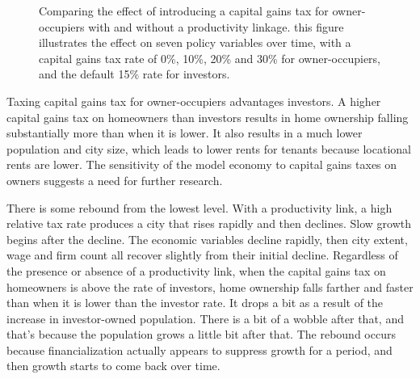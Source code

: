 \begin{figure}[h!tb]
     \caption[Capital gains tax for owner-occupiers with and without a linkage]{Comparing the effect of introducing a capital gains tax for owner-occupiers with and without a productivity linkage. this figure illustrates the effect on seven policy variables over time, with a capital gains tax rate of 0\%, 10\%, 20\% and 30\% for owner-occupiers, and the default 15\% rate for investors.}
    \label{fig:CG-pers_link_W-WO-Cost-of-capital}
\end{figure}
Taxing capital gains tax for owner-occupiers advantages investors. 
A higher capital gains tax on homeowners than investors %
results in home ownership falling substantially more than when it is lower. It also results in a much lower population and city size, which leads to lower rents for tenants because locational rents are lower. The sensitivity of the model economy to capital gains taxes on owners suggests a need for further research. 

There is some rebound from the lowest level. 
With a productivity link, a high relative tax rate produces a city that rises rapidly and then declines. Slow growth begins after the decline. The economic variables decline rapidly, %
then city extent, wage and firm count all recover slightly from their initial decline. %
Regardless of the presence or absence of a productivity link, when the capital gains tax on homeowners is above the rate of investors, %
home ownership falls farther and faster than when it is lower than the investor rate. 
It drops a bit as a result of the increase in investor-owned population. There is a bit of a wobble after that, and that's because the population grows a little bit after that. The rebound occurs because financialization actually appears to suppress growth for a period, and then growth starts to come back over time. 


